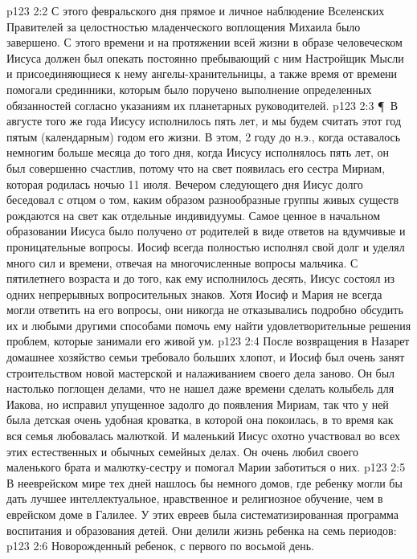 \vs p123 2:2 С этого февральского дня прямое и личное наблюдение Вселенских Правителей за целостностью младенческого воплощения Михаила было завершено. С этого времени и на протяжении всей жизни в образе человеческом Иисуса должен был опекать постоянно пребывающий с ним Настройщик Мысли и присоединяющиеся к нему ангелы\hyp{}хранительницы, а также время от времени помогали срединники, которым было поручено выполнение определенных обязанностей согласно указаниям их планетарных руководителей.
\vs p123 2:3 \P\ В августе того же года Иисусу исполнилось пять лет, и мы будем считать этот год пятым (календарным) годом его жизни. В этом, 2 году до н.э., когда оставалось немногим больше месяца до того дня, когда Иисусу исполнялось пять лет, он был совершенно счастлив, потому что на свет появилась его сестра Мириам, которая родилась ночью 11 июля. Вечером следующего дня Иисус долго беседовал с отцом о том, каким образом разнообразные группы живых существ рождаются на свет как отдельные индивидуумы. Самое ценное в начальном образовании Иисуса было получено от родителей в виде ответов на вдумчивые и проницательные вопросы. Иосиф всегда полностью исполнял свой долг и уделял много сил и времени, отвечая на многочисленные вопросы мальчика. С пятилетнего возраста и до того, как ему исполнилось десять, Иисус состоял из одних непрерывных вопросительных знаков. Хотя Иосиф и Мария не всегда могли ответить на его вопросы, они никогда не отказывались подробно обсудить их и любыми другими способами помочь ему найти удовлетворительные решения проблем, которые занимали его живой ум.
\vs p123 2:4 После возвращения в Назарет домашнее хозяйство семьи требовало больших хлопот, и Иосиф был очень занят строительством новой мастерской и налаживанием своего дела заново. Он был настолько поглощен делами, что не нашел даже времени сделать колыбель для Иакова, но исправил упущенное задолго до появления Мириам, так что у ней была детская очень удобная кроватка, в которой она покоилась, в то время как вся семья любовалась малюткой. И маленький Иисус охотно участвовал во всех этих естественных и обычных семейных делах. Он очень любил своего маленького брата и малютку\hyp{}сестру и помогал Марии заботиться о них.
\vs p123 2:5 В нееврейском мире тех дней нашлось бы немного домов, где ребенку могли бы дать лучшее интеллектуальное, нравственное и религиозное обучение, чем в еврейском доме в Галилее. У этих евреев была систематизированная программа воспитания и образования детей. Они делили жизнь ребенка на семь периодов:
\vs p123 2:6 \bibnobreakspace Новорожденный ребенок, с первого по восьмой день.
